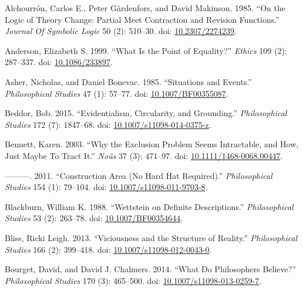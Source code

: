 \documentclass[
  10pt,
  letterpaper,
  DIV=11,
  numbers=noendperiod,
  twoside]{scrartcl}
\newlength{\cslhangindent}
\newenvironment{CSLReferences}[2] %
 {\begin{list}{}{%
  \setlength{\itemindent}{0pt}
  \setlength{\leftmargin}{0pt}
  \setlength{\parsep}{0pt}
  \ifodd #1
   \setlength{\leftmargin}{\cslhangindent}
   \setlength{\itemindent}{-1\cslhangindent}
  \fi
  \setlength{\itemsep}{#2\baselineskip}}}
 {\end{list}}
\begin{document}
\label{refs}
\begin{CSLReferences}{1}{0}
Alchourrón, Carlos E., Peter Gärdenfors, and David Makinson. 1985. {``On
the Logic of Theory Change: Partial Meet Contraction and Revision
Functions.''} \emph{Journal Of Symbolic Logic} 50 (2): 510--30. doi:
\href{https://doi.org/10.2307/2274239}{10.2307/2274239}.

Anderson, Elizabeth S. 1999. {``What Is the Point of Equality?''}
\emph{Ethics} 109 (2): 287--337. doi:
\href{https://doi.org/10.1086/233897}{10.1086/233897}.

Asher, Nicholas, and Daniel Bonevac. 1985. {``Situations and Events.''}
\emph{Philosophical Studies} 47 (1): 57--77. doi:
\href{https://doi.org/10.1007/BF00355087}{10.1007/BF00355087}.

Beddor, Bob. 2015. {``Evidentialism, Circularity, and Grounding.''}
\emph{Philosophical Studies} 172 (7): 1847--68. doi:
\href{https://doi.org/10.1007/s11098-014-0375-z}{10.1007/s11098-014-0375-z}.

Bennett, Karen. 2003. {``Why the Exclusion Problem Seems Intractable,
and How, Just Maybe To Tract It.''} \emph{Noûs} 37 (3): 471--97. doi:
\href{https://doi.org/10.1111/1468-0068.00447}{10.1111/1468-0068.00447}.

---------. 2011. {``Construction Area (No Hard Hat Required).''}
\emph{Philosophical Studies} 154 (1): 79--104. doi:
\href{https://doi.org/10.1007/s11098-011-9703-8}{10.1007/s11098-011-9703-8}.

Blackburn, William K. 1988. {``Wettstein on Definite Descriptions.''}
\emph{Philosophical Studies} 53 (2): 263--78. doi:
\href{https://doi.org/10.1007/BF00354644}{10.1007/BF00354644}.

Bliss, Ricki Leigh. 2013. {``Viciousness and the Structure of
Reality.''} \emph{Philosophical Studies} 166 (2): 399--418. doi:
\href{https://doi.org/10.1007/s11098-012-0043-0}{10.1007/s11098-012-0043-0}.

Bourget, David, and David J. Chalmers. 2014. {``What Do Philosophers
Believe?''} \emph{Philosophical Studies} 170 (3): 465--500. doi:
\href{https://doi.org/10.1007/s11098-013-0259-7}{10.1007/s11098-013-0259-7}.


\end{CSLReferences}
\end{document}
